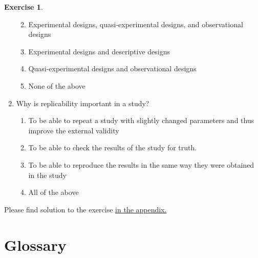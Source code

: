 \documentclass[
  12pt,
  oneside]{book}
\providecommand{\tightlist}{%
  \setlength{\itemsep}{0pt}\setlength{\parskip}{0pt}}
\theoremstyle{definition}
\theoremstyle{definition}
\theoremstyle{definition}
\newtheorem{exercise}{Exercise}[chapter]
\theoremstyle{definition}
\theoremstyle{remark}
\begin{document}
\begin{exercise}
\begin{enumerate}
  \begin{enumerate}
  \def\labelenumii{\alph{enumii})}
  \tightlist
  \item
    Experimental designs, quasi-experimental designs, and observational designs
  \item
    Experimental designs and descriptive designs
  \item
    Quasi-experimental designs and observational designs
  \item
    None of the above
  \end{enumerate}
\item
  Why is replicability important in a study?

  \begin{enumerate}
  \def\labelenumii{\alph{enumii})}
  \tightlist
  \item
    To be able to repeat a study with slightly changed parameters and thus improve the external validity
  \item
    To be able to check the results of the study for truth.
  \item
    To be able to reproduce the results in the same way they were obtained in the study
  \item
    All of the above
  \end{enumerate}
\end{enumerate}

Please find solution to the exercise \protect\hyperlink{sol:featofresear}{in the appendix.}
\end{exercise}

\hypertarget{glossary}{%
\section*{Glossary}\label{glossary}}
\end{document}
